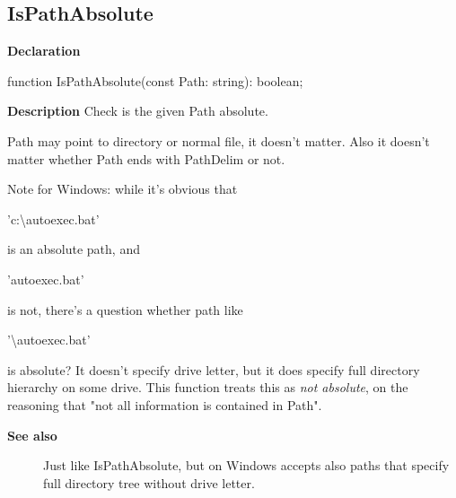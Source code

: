 \documentclass{report}
\newif\ifpdf
\begin{document}
\subsection*{IsPathAbsolute}
\fi
\label{PasDoc_Utils-IsPathAbsolute}
\begin{list}{}{
\setlength{\itemindent}{0cm}
\setlength{\listparindent}{0cm}
\setlength{\leftmargin}{\evensidemargin}
\addtolength{\leftmargin}{\tmplength}
\settowidth{\labelsep}{X}
\addtolength{\leftmargin}{\labelsep}
\setlength{\labelwidth}{\tmplength}
}
\item[\textbf{Declaration}\hfill]
\ifpdf
\begin{flushleft}
\fi
\begin{ttfamily}
function IsPathAbsolute(const Path: string): boolean;\end{ttfamily}

\ifpdf
\end{flushleft}
\fi

\par
\item[\textbf{Description}]
Check is the given Path absolute.

Path may point to directory or normal file, it doesn't matter. Also it doesn't matter whether Path ends with PathDelim or not.

Note for Windows: while it's obvious that \begin{ttfamily}'c:{\textbackslash}autoexec.bat'\end{ttfamily} is an absolute path, and \begin{ttfamily}'autoexec.bat'\end{ttfamily} is not, there's a question whether path like \begin{ttfamily}'{\textbackslash}autoexec.bat'\end{ttfamily} is absolute? It doesn't specify drive letter, but it does specify full directory hierarchy on some drive. This function treats this as \textit{not absolute}, on the reasoning that "not all information is contained in Path".

\item[\textbf{See also}]
\begin{description}
\item[\begin{ttfamily}IsPathAbsoluteOnDrive\end{ttfamily}(\ref{PasDoc_Utils-IsPathAbsoluteOnDrive})] 
Just like IsPathAbsolute, but on Windows accepts also paths that specify full directory tree without drive letter.
\end{description}


\end{list}
\ifpdf
\end{document}
